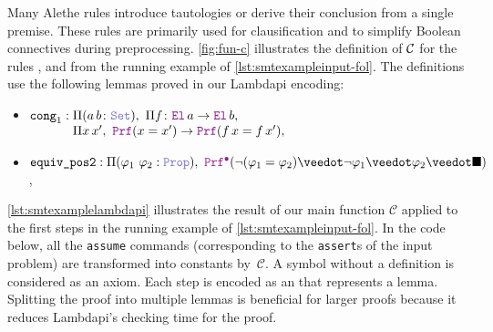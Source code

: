 Many Alethe rules introduce tautologies or derive their conclusion from a single premise.
%
These rules are primarily used for clausification and to simplify Boolean connectives during
preprocessing.
%
\cref{fig:fun-c} illustrates the definition of $\cal{C}$ for the rules ,  and  from the running example of \cref{lst:smtexampleinput-fol}.
The definitions use the following lemmas proved in our Lambdapi encoding:
\begin{itemize}
\item $\kw{cong}_1 :
    \begin{array}[t]{@{}l@{}}
        \Pi (a\,b \colon \set),\ \Pi f \colon \el\,a \ra \el\,b, \\
        \Pi x\,x',\ \prf (x = x') \ra \prf (f\,x = f\,x'),
    \end{array}$
\item $\kw{equiv\_pos2} : \Pi (\varphi_1~\varphi_2: \prop),\ \pid (\neg (\varphi_1 = \varphi_2) \veedot \neg \varphi_1 \veedot \varphi_2 \veedot \nil )$,
\end{itemize}


\begin{example}
  \cref{lst:smtexamplelambdapi} illustrates the result of our main function $\mathcal{C}$ applied to the first steps in the running example of \cref{lst:smtexampleinput-fol}.
  In the code below, all the \texttt{assume} commands (corresponding to the \texttt{assert}s of the input problem) are transformed into constants by~$\mathcal{C}$. A symbol without a definition is considered as an axiom.
  Each step is encoded as an  that represents a lemma. Splitting the proof into multiple lemmas is beneficial for larger proofs because it reduces Lambdapi's checking time for the proof.
\end{example}

